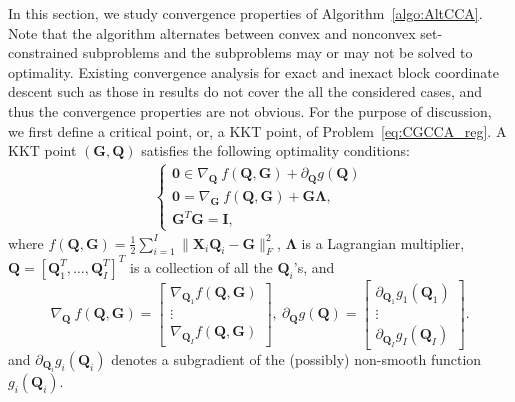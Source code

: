 \documentclass[10pt,journal]{IEEEtran}
\newcommand{\G}{\boldsymbol{G}}
\newcommand{\Q}{\boldsymbol{Q}}
\newcommand{\X}{\boldsymbol{X}}
\begin{document}
In this section, we study convergence properties of Algorithm~\ref{algo:AltCCA}.
Note that the algorithm alternates between convex and nonconvex set-constrained subproblems and the subproblems may or may not be solved to optimality.
Existing convergence analysis for exact and inexact block coordinate descent such as those in \cite{bertsekas1999nonlinear,razaviyayn2013unified,xu2013block,xu2014globally} results do not cover the all the considered cases,
and thus the convergence properties are not obvious.
For the purpose of discussion, we first define a critical point, or, a KKT point, of Problem~\eqref{eq:CGCCA_reg}.
A KKT point $(\G,\Q)$ satisfies the following optimality conditions:
\begin{align}\label{eq:KKT}
\begin{cases}
 {\bm 0}\in \nabla_{\Q}~f(\Q,\G) + \partial_{\Q} g(\Q)\\
 {\bm 0}= \nabla_{\G}~f(\Q,\G) + \G{\bm \Lambda},\\
 \G^T\G = \bm I,
\end{cases}
\end{align}
where $f(\Q,\G)=\frac{1}{2}\sum_{i=1}^I\|\X_i\Q_i-\G\|_F^2$, ${\bm \Lambda}$
is a Lagrangian multiplier, $\Q=[\Q_1^T,\ldots,\Q_I^T]^T$ is a collection of
all the $\Q_i$'s, and
\begin{equation}\label{eq:definie_diff}
\nabla_{\Q}~f(\Q,\G) =\begin{bmatrix}
          \nabla_{\Q_1}f(\Q,\G)\\
          \vdots\\
          \nabla_{\Q_I}f(\Q,\G)
\end{bmatrix},~
\partial_{\Q} g(\Q) =\begin{bmatrix}
         \partial_{\Q_1} g_1(\Q_1)\\
          \vdots\\
          \partial_{\Q_I} g_I(\Q_I)
\end{bmatrix}.
\end{equation}
and $\partial_{\Q_i} g_i(\Q_i)$ denotes a subgradient of the (possibly) non-smooth function $g_i(\Q_i)$.
\end{document}
